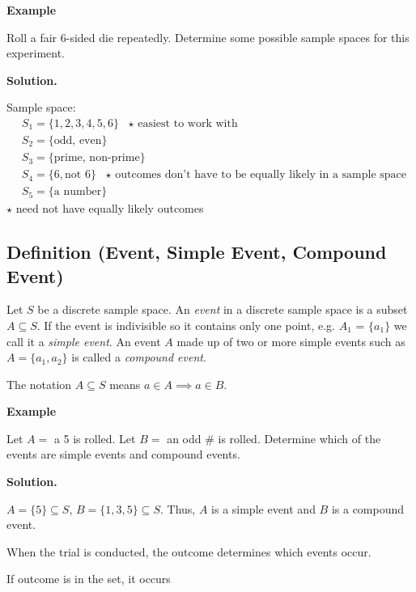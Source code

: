 \textbf{Example}

Roll a fair 6-sided die repeatedly. Determine some possible sample spaces
for this experiment.

\textbf{Solution.}

Sample space:
\begin{align*}
     & S_1=\{1,2,3,4,5,6\} \text{ $\star$ easiest to work with}                        \\
     & S_2=\{\text{odd, even}\}                                                        \\
     & S_3=\{\text{prime, non-prime}\}                                                 \\
     & S_4=\{6, \text{not } 6\}\text{ $\star$ outcomes don't have to be equally likely
    in a sample space}                                                                 \\
     & S_5=\{\text{a number}\}
\end{align*}
$\star$ need not have equally likely outcomes

\begin{defbox}
    \subsection{Definition (Event, Simple Event, Compound Event)}
    Let $ S $ be a discrete sample space. An \emph{event} in a discrete
    sample space is a subset $ A\subseteq S $. If the event is indivisible so it
    contains only one point, e.g. $A_1$ = $ \{a_1\} $ we call it a \emph{simple event}.
    An event $A$ made up of two or more simple events
    such as $ A=\{a_1,a_2\} $ is called a \emph{compound event}.
\end{defbox}
\begin{remark}
    The notation $ A\subseteq S $ means $ a\in A \implies a\in B $.
\end{remark}

\textbf{Example}

Let $ A= $ a 5 is rolled. Let $ B= $ an odd \# is rolled. Determine which of
the events are simple events and compound events.

\textbf{Solution.}

$ A=\{5\}\subseteq S $, $ B=\{1,3,5\}\subseteq S $. Thus,
$ A $ is a simple event and $ B $ is a compound event.

When the trial is conducted, the outcome determines which events
occur.

If outcome is in the set, it occurs

